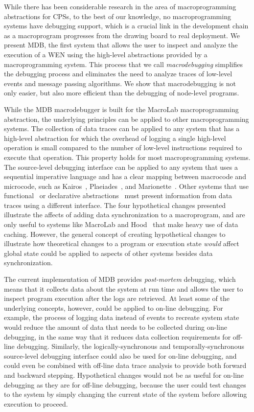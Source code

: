 While there has been considerable research in the area of macroprogramming
abstractions for CPSs, to the best of our knowledge, no macroprogramming systems
have debugging support, which is a crucial link in the development chain as a
macroprogram progresses from the drawing board to real deployment. We present
MDB, the first system that allows the user to inspect and analyze the execution
of a WEN using the high-level abstractions provided by a macroprogramming
system.  This process that we call \emph{macrodebugging} simplifies the
debugging process and eliminates the need to analyze traces of low-level events
and message passing algorithms.  We show that macrodebugging is not only easier,
but also more efficient than the debugging of node-level programs.

While the MDB macrodebugger is built for the MacroLab macroprogramming
abstraction, the underlying principles can be applied to other
macroprogramming systems.  The collection of data traces can be applied to any
system that has a high-level abstraction for which the overhead of logging a
single high-level operation is small compared to the number of low-level
instructions required to execute that operation.  This property holds for most
macroprogramming systems.  The source-level debugging interface can be applied
to any system that uses a sequential imperative language and has a clear mapping
between macrocode and microcode, such as Kairos~\cite{Gummadi},
Plaeiades~\cite{Kothari}, and Marionette~\cite{Whitehouseb}.  Other systems that
use functional~\cite{Newton} or declarative abstractions~\cite{Madden} must
present information from data traces using a different interface.  The four
hypothetical changes presented illustrate the affects of adding data
synchronization to a macroprogram, and are only useful to systems like MacroLab
and Hood~\cite{Whitehousea} that make heavy use of data caching.  However, the
general concept of creating hypothetical changes to illustrate how theoretical
changes to a program or execution state \emph{would} affect global state could
be applied to aspects of other systems besides data synchronization.

The current implementation of MDB provides \emph{post-mortem} debugging, which
means that it collects data about the system at run time and allows the user to
inspect program execution after the logs are retrieved.  At least some of the
underlying concepts, however, could be applied to on-line debugging.  For
example, the process of logging data instead of events to recreate system state
would reduce the amount of data that needs to be collected during on-line
debugging, in the same way that it reduces data collection requirements for
off-line debugging.  Similarly, the logically-synchronous and
temporally-synchronous source-level debugging interface could also be used for
on-line debugging, and could even be combined with off-line data trace analysis to
provide both forward and backward stepping. Hypothetical changes would not be as
useful for on-line debugging as they are for off-line debugging, because the
user could test changes to the system by simply changing the current state of
the system before allowing execution to proceed.

